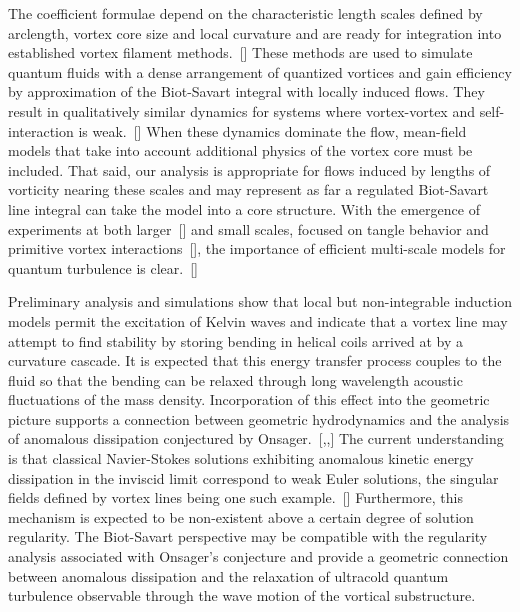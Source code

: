 \documentclass[aps,graphicx,reprint,onecolumn,12pt,tightenlines,longbibliography]{revtex4-1}
\newcommand{\sas}[2]{{#2}}
\begin{document}
{The coefficient formulae depend on the characteristic length scales defined by arclength, vortex core size and local curvature and are ready for integration into established vortex filament methods.~[] These methods are used to simulate quantum fluids with a dense arrangement of quantized vortices and gain efficiency by approximation of the Biot-Savart integral with locally induced flows. They result in qualitatively similar dynamics for systems where vortex-vortex and self-interaction \sas{interaction}{} is weak.~[] When these dynamics dominate the flow, mean-field models that take into account \sas{the}{additional} physics of the vortex core must be included. That said, our analysis is appropriate for flows induced by lengths of vorticity nearing these scales and may represent as far a regulated Biot-Savart line integral can take the model into a core structure. With the emergence of experiments at both larger~[] and small scale\sas{}{s}, focused on tangle behavior and primitive vortex interactions~[], the importance of efficient multi-scale models for quantum turbulence is clear.~[]   

Preliminary analysis and simulations show that local but non-integrable induction models permit the excitation of Kelvin waves and indicate that a vortex line may attempt to find stability by storing bending in helical coils arrived at by a curvature cascade. It is expected that this energy transfer process couples to the fluid so that the bending can be relaxed through long wavelength acoustic fluctuations of the mass density. Incorporation of this effect into the geometric picture supports a connection between geometric hydrodynamics and the analysis of anomalous dissipation  conjectured by Onsager.~[,,] The current understanding is that classical Navier-Stokes solutions exhibiting anomalous kinetic energy dissipation in the inviscid limit correspond to weak Euler solutions, the singular fields defined by vortex lines being one such example.~[] Furthermore, this mechanism is expected to be non-existent above a certain degree of solution regularity. The Biot-Savart perspective may be compatible with the regularity analysis associated with Onsager's conjecture and provide a geometric connection between anomalous dissipation and the relaxation of  ultracold quantum turbulence observable through the wave motion of the vortical substructure. 

}
\end{document}
